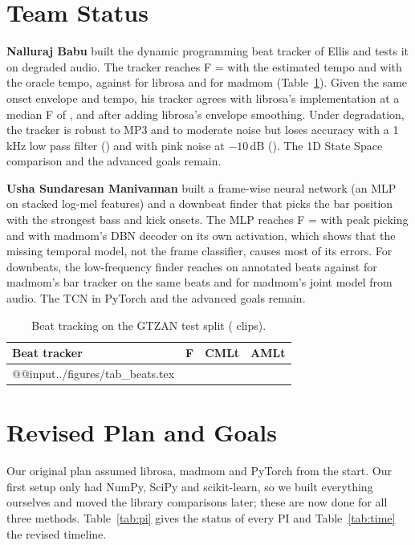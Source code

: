 \documentclass{article}
\begin{document}
\section{Team Status}
\label{sec:team}

\textbf{Nalluraj Babu} built the dynamic programming beat tracker of Ellis \cite{ellis} and tests it on degraded audio. The tracker reaches F = \DPF{} with the estimated tempo and \DPOracleF{} with the oracle tempo, against \LibF{} for librosa and \MadF{} for madmom (Table~\ref{tab:beats}). Given the same onset envelope and tempo, his tracker agrees with librosa's implementation at a median F of \AgreeRawMed{}, and \AgreeMed{} after adding librosa's envelope smoothing. Under degradation, the tracker is robust to MP3 and to moderate noise but loses accuracy with a 1\,kHz low pass filter (\DegLPOne{}) and with pink noise at $-10$\,dB (\DegNoiseMinusTen{}). The 1D State Space comparison and the advanced goals remain.

\textbf{Usha Sundaresan Manivannan} built a frame-wise neural network (an MLP on stacked log-mel features) and a downbeat finder that picks the bar position with the strongest bass and kick onsets. The MLP reaches F = \NNF{} with peak picking and \NNDBNF{} with madmom's DBN decoder on its own activation, which shows that the missing temporal model, not the frame classifier, causes most of its errors. For downbeats, the low-frequency finder reaches \DBOracle{} on annotated beats against \DBMadBar{} for madmom's bar tracker on the same beats and \DBMadJoint{} for madmom's joint model from audio. The TCN in PyTorch and the advanced goals remain.

\begin{table}[t]
\centering\small\setlength{\tabcolsep}{4pt}
\begin{tabular}{@{}lccc@{}}
\toprule
Beat tracker & F & CMLt & AMLt \\
\midrule
\csname @@input\endcsname ../figures/tab_beats.tex
\bottomrule
\end{tabular}
\caption{Beat tracking on the GTZAN test split (\NBeat{} clips).}
\label{tab:beats}
\end{table}

\PITable
\TimelineTable

\section{Revised Plan and Goals}

Our original plan assumed librosa, madmom and PyTorch from the start. Our first setup only had NumPy, SciPy and scikit-learn, so we built everything ourselves and moved the library comparisons later; these are now done for all three methods. Table~\ref{tab:pi} gives the status of every PI and Table~\ref{tab:time} the revised timeline.
\end{document}
